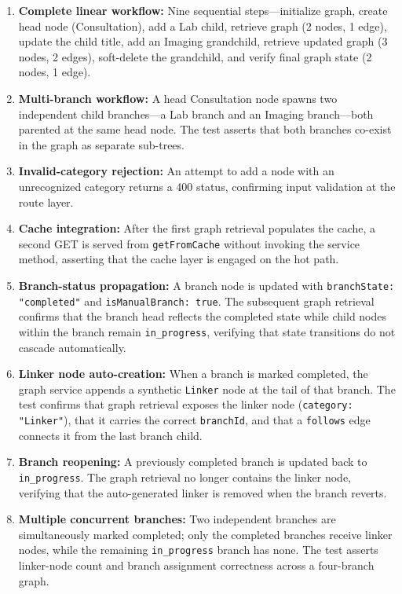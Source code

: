 \begin{enumerate}
  \item \textbf{Complete linear workflow:} Nine sequential steps---initialize
        graph, create head node (Consultation), add a Lab child, retrieve graph
        (2 nodes, 1 edge), update the child title, add an Imaging grandchild,
        retrieve updated graph (3 nodes, 2 edges), soft-delete the grandchild,
        and verify final graph state (2 nodes, 1 edge).

  \item \textbf{Multi-branch workflow:} A head Consultation node spawns two
        independent child branches---a Lab branch and an Imaging branch---both
        parented at the same head node. The test asserts that both branches
        co-exist in the graph as separate sub-trees.

  \item \textbf{Invalid-category rejection:} An attempt to add a node with an
        unrecognized category returns a 400 status, confirming input validation
        at the route layer.

  \item \textbf{Cache integration:} After the first graph retrieval populates
        the cache, a second GET is served from \texttt{getFromCache} without
        invoking the service method, asserting that the cache layer is engaged
        on the hot path.

  \item \textbf{Branch-status propagation:} A branch node is updated with
        \texttt{branchState: "completed"} and \texttt{isManualBranch: true}.
        The subsequent graph retrieval confirms that the branch head reflects
        the completed state while child nodes within the branch remain
        \texttt{in\_progress}, verifying that state transitions do not cascade
        automatically.

  \item \textbf{Linker node auto-creation:} When a branch is marked completed,
        the graph service appends a synthetic \texttt{Linker} node at the tail
        of that branch. The test confirms that graph retrieval exposes the linker
        node (\texttt{category: "Linker"}), that it carries the correct
        \texttt{branchId}, and that a \texttt{follows} edge connects it from the
        last branch child.

  \item \textbf{Branch reopening:} A previously completed branch is updated back
        to \texttt{in\_progress}. The graph retrieval no longer contains the
        linker node, verifying that the auto-generated linker is removed when the
        branch reverts.

  \item \textbf{Multiple concurrent branches:} Two independent branches are
        simultaneously marked completed; only the completed branches receive
        linker nodes, while the remaining \texttt{in\_progress} branch has none.
        The test asserts linker-node count and branch assignment correctness
        across a four-branch graph.
\end{enumerate}

